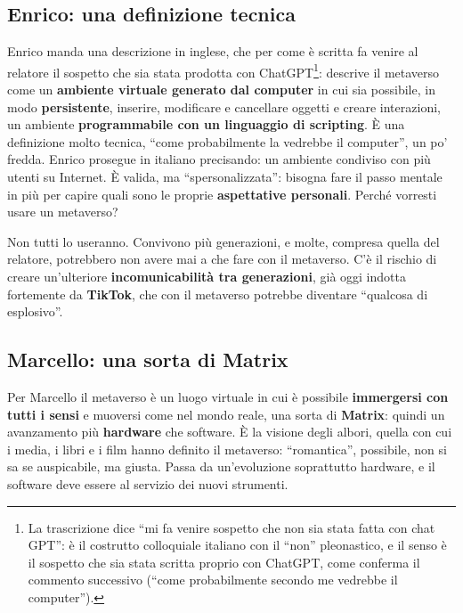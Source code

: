 \subsection{Enrico: una definizione tecnica}

Enrico manda una descrizione in inglese, che per come è scritta fa venire al
relatore il sospetto che sia stata prodotta con ChatGPT\footnote{La trascrizione
dice ``mi fa venire sospetto che non sia stata fatta con chat GPT'': è il
costrutto colloquiale italiano con il ``non'' pleonastico, e il senso è il
sospetto che sia stata scritta proprio con ChatGPT, come conferma il commento
successivo (``come probabilmente secondo me vedrebbe il computer'').}: descrive
il metaverso come un \textbf{ambiente virtuale generato dal computer} in cui sia
possibile, in modo \textbf{persistente}, inserire, modificare e cancellare
oggetti e creare interazioni, un ambiente \textbf{programmabile con un
linguaggio di scripting}. È una definizione molto tecnica, ``come probabilmente
la vedrebbe il computer'', un po' fredda. Enrico prosegue in italiano
precisando: un ambiente condiviso con più utenti su Internet. È valida, ma
``spersonalizzata'': bisogna fare il passo mentale in più per capire quali sono
le proprie \textbf{aspettative personali}. Perché vorresti usare un metaverso?

Non tutti lo useranno. Convivono più generazioni, e molte, compresa quella del
relatore, potrebbero non avere mai a che fare con il metaverso. C'è il rischio
di creare un'ulteriore \textbf{incomunicabilità tra generazioni}, già oggi
indotta fortemente da \textbf{TikTok}, che con il metaverso potrebbe diventare
``qualcosa di esplosivo''.

\subsection{Marcello: una sorta di Matrix}

Per Marcello il metaverso è un luogo virtuale in cui è possibile
\textbf{immergersi con tutti i sensi} e muoversi come nel mondo reale, una sorta
di \textbf{Matrix}: quindi un avanzamento più \textbf{hardware} che software. È
la visione degli albori, quella con cui i media, i libri e i film hanno definito
il metaverso: ``romantica'', possibile, non si sa se auspicabile, ma giusta.
Passa da un'evoluzione soprattutto hardware, e il software deve essere al
servizio dei nuovi strumenti.

